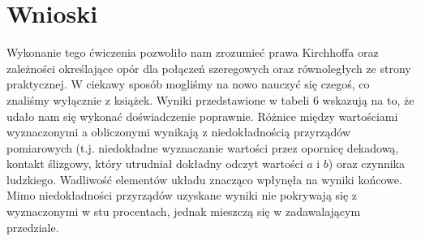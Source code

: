 \documentclass[a4paper,12pts]{article}
\begin{document}

\section{Wnioski}

Wykonanie tego ćwiczenia pozwoliło nam zrozumieć prawa Kirchhoffa oraz zależności określające opór dla połączeń szeregowych oraz równoległych ze strony praktycznej. W ciekawy sposób mogliśmy na nowo nauczyć się czegoś, co znaliśmy wyłącznie z książek. Wyniki przedstawione w tabeli 6 wskazują na to, że udało nam się wykonać doświadczenie poprawnie. Różnice między wartościami wyznaczonymi a obliczonymi wynikają z niedokładnością przyrządów pomiarowych (t.j. niedokładne wyznaczanie wartości przez opornicę dekadową, kontakt ślizgowy, który utrudniał dokładny odczyt wartości $a$ i $b$) oraz czynnika ludzkiego. Wadliwość elementów układu znacząco wpłynęła na wyniki końcowe. Mimo niedokładności przyrządów uzyskane wyniki nie pokrywają się z wyznaczonymi w stu procentach, jednak mieszczą się w zadawalającym przedziale. 
\end{document}
